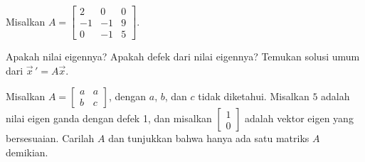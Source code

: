 \begin{exercise}
Misalkan $A =
\left[ \begin{smallmatrix}
2 & 0 & 0 \\
-1 & -1 & 9 \\
0 & -1 & 5
\end{smallmatrix}\right]$.  
\begin{tasks}
\task Apakah nilai eigennya?
\task Apakah defek dari nilai eigennya?
\task Temukan solusi umum dari $\vec{x}\,' = A\vec{x}$.
\end{tasks}
\end{exercise}

\begin{exercise}
Misalkan $A =
\left[ \begin{smallmatrix}
a & a \\
b & c
\end{smallmatrix}\right]$, dengan $a$, $b$, dan $c$ tidak diketahui.
Misalkan $5$ adalah nilai eigen ganda dengan defek 1, dan misalkan
$\left[ \begin{smallmatrix}
1 \\ 0
\end{smallmatrix}\right]$ adalah vektor eigen yang bersesuaian.  Carilah $A$ dan tunjukkan bahwa
hanya ada satu matriks $A$ demikian.
\end{exercise}

